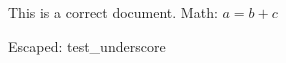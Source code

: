 \documentclass{article}
\begin{document}
This is a correct document. Math: $a = b + c$

Escaped: test\_underscore
\end{document}
